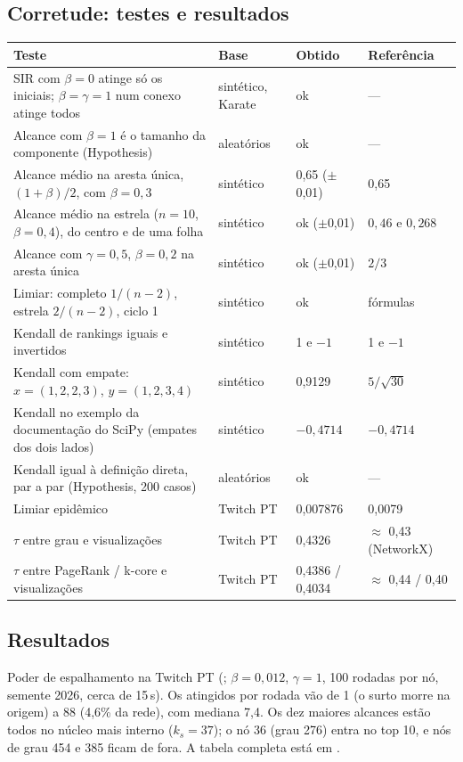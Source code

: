 \subsection{Corretude: testes e resultados}

{\small\begin{tabularx}{\linewidth}{@{}Y L{2.5cm} L{2.2cm} L{3.8cm}@{}}
\toprule
Teste & Base & Obtido & Referência \\
\midrule
SIR com $\beta = 0$ atinge só os iniciais; $\beta = \gamma = 1$ num conexo atinge todos & sintético, Karate & ok & --- \\
Alcance com $\beta = 1$ é o tamanho da componente (Hypothesis) & aleatórios & ok & --- \\
Alcance médio na aresta única, $(1+\beta)/2$, com $\beta = 0{,}3$ & sintético & 0,65 ($\pm$0,01) & 0,65 \\
Alcance médio na estrela ($n = 10$, $\beta = 0{,}4$), do centro e de uma folha & sintético & ok ($\pm$0,01) & $0{,}46$ e $0{,}268$ \\
Alcance com $\gamma = 0{,}5$, $\beta = 0{,}2$ na aresta única & sintético & ok ($\pm$0,01) & $2/3$ \\
Limiar: completo $1/(n-2)$, estrela $2/(n-2)$, ciclo 1 & sintético & ok & fórmulas \\
Kendall de rankings iguais e invertidos & sintético & 1 e $-1$ & 1 e $-1$ \\
Kendall com empate: $x = (1,2,2,3)$, $y = (1,2,3,4)$ & sintético & 0,9129 & $5/\sqrt{30}$ \\
Kendall no exemplo da documentação do SciPy (empates dos dois lados) & sintético & $-0{,}4714$ & $-0{,}4714$ \\
Kendall igual à definição direta, par a par (Hypothesis, 200 casos) & aleatórios & ok & --- \\
Limiar epidêmico & Twitch PT & 0,007876 & 0,0079 \\
$\tau$ entre grau e visualizações & Twitch PT & 0,4326 & $\approx$ 0,43 (NetworkX) \\
$\tau$ entre PageRank / k-core e visualizações & Twitch PT & 0,4386 / 0,4034 & $\approx$ 0,44 / 0,40 \\
\bottomrule
\end{tabularx}}

\subsection{Resultados}
Poder de espalhamento na Twitch PT (; $\beta = 0{,}012$,
$\gamma = 1$, 100 rodadas por nó, semente 2026, cerca de 15\,s). Os atingidos por rodada vão de 1
(o surto morre na origem) a 88 (4,6\% da rede), com mediana 7,4. Os dez maiores alcances estão
todos no núcleo mais interno ($k_s = 37$); o nó 36 (grau 276) entra no top 10, e nós de grau 454 e
385 ficam de fora. A tabela completa está em .

